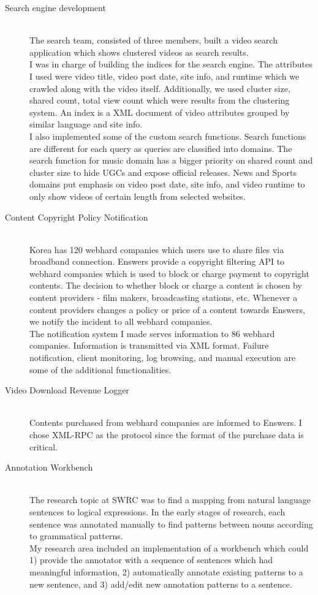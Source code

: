 \documentclass[line,margin]{res}
\begin{document}
\begin{resume}
\begin{description}
                              \item[Search engine development] \hfill \\
                The search team, consisted of three members, built a video search application which shows clustered videos as search results.\\
                 I was in charge of building the indices for the search engine. The attributes I used were video title, video post date, site info, and runtime which we crawled along with the video itself. Additionally, we used cluster size, shared count, total view count which were results from the clustering system. An index is a XML document of video attributes grouped by similar language and site info.\\
                 I also implemented some of the custom search functions. Search functions are different for each query as queries are classified into domains. The search function for music domain has a bigger priority on shared count and cluster size to hide UGCs and expose official releases. News and Sports domains put emphasis on video post date, site info, and video runtime to only show videos of certain length from selected websites.
                              \item[Content Copyright Policy Notification] \hfill \\
                Korea has 120 webhard companies which users use to share files via broadband connection. Enswers provide a copyright filtering API to webhard companies which is used to block or charge payment to copyright contents. The decision to whether block or charge a content is chosen by content providers - film makers, broadcasting stations, etc. Whenever a content providers changes a policy or price of a content towards Enswers, we notify the incident to all webhard companies.\\
                 The notification system I made serves information to 86 webhard companies. Information is transmitted via XML format. Failure notification, client monitoring, log browsing, and manual execution are some of the additional functionalities.
                              \item[Video Download Revenue Logger] \hfill \\
                Contents purchased from webhard companies are informed to Enswers. I chose XML-RPC as the protocol since the format of the purchase data is critical.
\item[Annotation Workbench] \hfill \\
 The research topic at SWRC was to find a mapping from natural language sentences to logical expressions. In the early stages of research, each sentence was annotated manually to find patterns between nouns according to grammatical patterns. \\ My research area included an implementation of a workbench which could 1) provide the annotator with a sequence of sentences which had meaningful information, 2) automatically annotate existing patterns to a new sentence, and 3) add/edit new annotation patterns to a sentence.
\end{description}
\end{resume}
\end{document}
